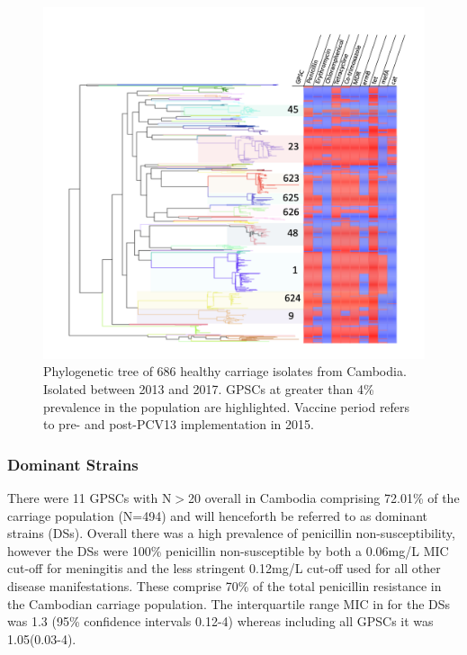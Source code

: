 \documentclass{article}
\begin{document}
\begin{figure}
    \centering
    \includegraphics[width=\textwidth]{tree.png}
    \caption{Phylogenetic tree of 686 healthy carriage isolates from Cambodia. Isolated between 2013 and 2017. GPSCs at greater than 4\% prevalence in the population are highlighted. Vaccine period refers to pre- and post-PCV13 implementation in 2015.}
    \label{fig:tree}
\end{figure}
\subsubsection{Dominant Strains}
There were 11 GPSCs with N$>$20 overall in Cambodia comprising 72.01\% of the carriage population (N=494) and will henceforth be referred to as dominant strains (DSs). Overall there was a high prevalence of penicillin non-susceptibility, however the DSs were 100\% penicillin non-susceptible by both a 0.06mg/L MIC cut-off for meningitis and the less stringent 0.12mg/L cut-off used for all other disease manifestations. These comprise 70\% of the total penicillin resistance in the Cambodian carriage population. The interquartile range MIC in for the DSs was 1.3 (95\% confidence intervals 0.12-4) whereas including all GPSCs it was 1.05(0.03-4). 
\end{document}

